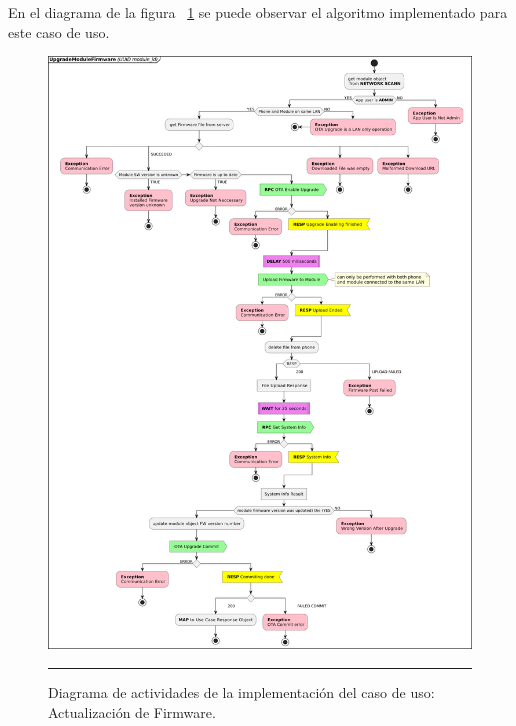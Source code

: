 En el diagrama de la figura ~\ref{fig:act_ota} se puede observar el algoritmo implementado para este caso de uso.

\begin{figure}[htbp]
	\centering
	\includegraphics[width=\textwidth]{Figures/iter3/ACT_ota_ink.png}
	\rule{35em}{1pt}
	\caption[Class Diagram]{Diagrama de actividades de la implementación del caso de uso: Actualización de Firmware.}
	\label{fig:act_ota}
\end{figure}

